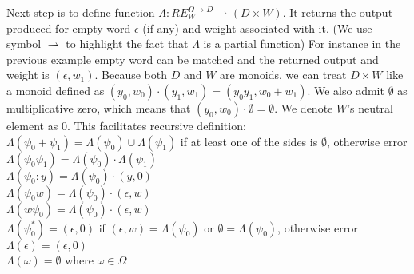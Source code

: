 Next step is to define function $\Lambda:RE_W^{\Omega\rightarrow D} \rightharpoonup ( D \times W)$. It returns the output produced for empty word $\epsilon$ (if any) and weight associated with it. (We use symbol $\rightharpoonup$ to highlight the fact that $\Lambda$ is a partial function) For instance in the previous example empty word can be matched and the returned output and weight is $(\epsilon,w_1)$. Because both $D$ and $W$ are monoids, we can treat $D \times W$ like a monoid defined as $(y_0,w_0)\cdot(y_1,w_1) = (y_0y_1,w_0+w_1)$. We also admit $\emptyset$ as multiplicative zero, which means that $(y_0,w_0)\cdot\emptyset=\emptyset$. We denote  $W$'s neutral element as $0$. This facilitates recursive definition: \\
$\Lambda(\psi_0+\psi_1) = \Lambda(\psi_0) \cup \Lambda(\psi_1)$ if at least one of the sides is $\emptyset$, otherwise error\\
$\Lambda(\psi_0\psi_1) =\Lambda(\psi_0) \cdot \Lambda(\psi_1)$ \\
$\Lambda(\psi_0 : y) = \Lambda(\psi_0) \cdot (y,0)$ \\
$\Lambda(\psi_0 w) = \Lambda(\psi_0) \cdot (\epsilon,w)$\\
$\Lambda(w \psi_0 ) =  \Lambda(\psi_0) \cdot (\epsilon,w)$ \\
$\Lambda(\psi_0^* ) = (\epsilon,0)$ if $(\epsilon,w) = \Lambda(\psi_0) $ or $\emptyset = \Lambda(\psi_0) $, otherwise error \\
$\Lambda(\epsilon) = (\epsilon,0)$\\
$\Lambda(\omega) = \emptyset$ where $\omega\in\Omega$

